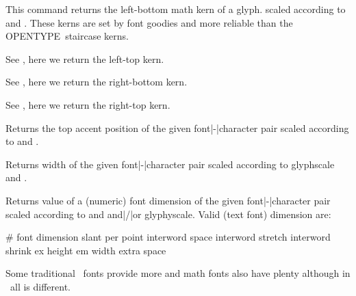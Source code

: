 This command returns the left-bottom math kern of a glyph. scaled according to
 and . These kerns are set by \CONTEXT font
goodies and more reliable than the OPENTYPE\ staircase kerns.

\stopnewprimitive

\startnewprimitive[title={\prm {scaledfontcharlt}}]

See , here we return the left-top kern.

\stopnewprimitive

\startnewprimitive[title={\prm {scaledfontcharrb}}]

See , here we return the right-bottom kern.

\stopnewprimitive

\startnewprimitive[title={\prm {scaledfontcharrt}}]

See , here we return the right-top kern.

\stopnewprimitive

\startnewprimitive[title={\prm {scaledfontcharta}}]

Returns the top accent position of the given font|-|character pair scaled
according to  and .

\stopnewprimitive

\startnewprimitive[title={\prm {scaledfontcharwd}}]

Returns width of the given font|-|character pair scaled according to \prm
{glyphscale} and .

\stopnewprimitive

\startnewprimitive[title={\prm {scaledfontdimen}}]

Returns value of a (numeric) font dimension of the given font|-|character pair
scaled according to  and  and|/|or \prm
{glyphyscale}. Valid (text font) dimension are:

\starttabulate[|c|l|]
\BC \# \BC font dimension    \NC \NR
{}  \NC slant per point   \NC \NR
{}  \NC interword space   \NC \NR
{}  \NC interword stretch \NC \NR
{}  \NC interword shrink  \NC \NR
{}  \NC ex height         \NC \NR
{}  \NC em width          \NC \NR
{}  \NC extra space       \NC \NR
\stoptabulate

Some traditional \TEX\ fonts provide more and math fonts also have
plenty although in \OPENTYPE\ all is different.

\stopnewprimitive


